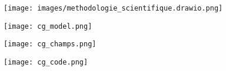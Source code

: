 



 \label{annexe_methodologie}

\begin{figure}[htb]
\centering
\texttt{[image: images/methodologie\_scientifique.drawio.png]}
\end{figure}

 \label{annexe_cg_gui_model}

\begin{figure}[htb]
\centering
\texttt{[image: cg\_model.png]}
\end{figure}

 \label{annexe_cg_gui_champs}

\begin{figure}[htb]
\centering
\texttt{[image: cg\_champs.png]}
\end{figure}

 \label{annexe_cg_gui_code}

\begin{figure}[htb]
\centering
\texttt{[image: cg\_code.png]}
\end{figure}

 \label{annexe_cg_gui_hook}

